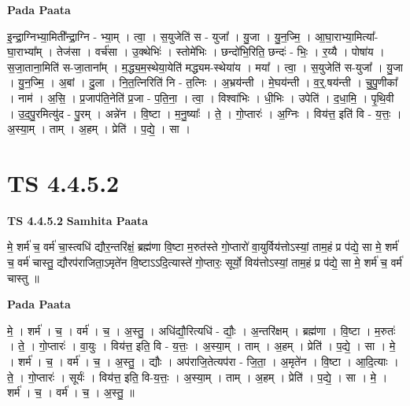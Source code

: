 \documentclass[17pt]{extarticle}
\begin{document}
\textbf{Pada Paata} \newline

इ॒न्द्रा॒ग्निभ्या॒मिती᳚न्द्रा॒ग्नि - भ्या॒म् । त्वा॒ । स॒युजेति॑ स - युजा᳚ । यु॒जा । यु॒न॒ज्मि॒ । आ॒घा॒राभ्या॒मित्या᳚-घा॒राभ्या᳚म् । तेज॑सा । वर्च॑सा । उ॒क्थेभिः॑ । स्तोमे॑भिः । छन्दो॑भि॒रिति॒ छन्दः॑ - भिः॒ । र॒य्यै । पोषा॑य । स॒जा॒ताना॒मिति॑ स-जा॒ताना᳚म् । म॒द्ध्य॒म॒स्थेया॒येति॑ मद्ध्यम-स्थेया॑य । मया᳚ । त्वा॒ । स॒युजेति॑ स-युजा᳚ । यु॒जा । यु॒न॒ज्मि॒ । अ॒बां । दु॒ला । नि॒त॒त्निरिति॑ नि - त॒त्निः । अ॒भ्रय॑न्ती । मे॒घय॑न्ती । व॒र्॒.षय॑न्ती । चु॒पु॒णीका᳚ । नाम॑ । अ॒सि॒ । प्र॒जाप॑ति॒नेति॑ प्र॒जा - प॒ति॒ना॒ । त्वा॒ । विश्वा॑भिः । धी॒भिः । उपेति॑ । द॒धा॒मि॒ । पृ॒थि॒वी । उ॒द॒पु॒रमित्यु॑द - पु॒रम् । अन्ने॑न । वि॒ष्टा । म॒नु॒ष्याः᳚ । ते॒ । गो॒प्तारः॑ । अ॒ग्निः । विय॑त्त॒ इति॑ वि - य॒त्तः॒ । अ॒स्या॒म् । ताम् । अ॒हम् । प्रेति॑ । प॒द्ये॒ । सा ।  \newline




\section*{ TS 4.4.5.2 }

\textbf{TS 4.4.5.2 } \newline
\textbf{Samhita Paata} \newline

मे॒ शर्म॑ च॒ वर्म॑ चा॒स्त्वधि॑ द्यौर॒न्तरि॑क्षं॒ ब्रह्म॑णा वि॒ष्टा म॒रुत॑स्ते गो॒प्तारो॑ वा॒युर्विय॑त्तोऽस्यां॒ ताम॒हं प्र प॑द्ये॒ सा मे॒ शर्म॑ च॒ वर्म॑ चास्तु॒ द्यौरप॑राजिता॒ऽमृते॑न वि॒ष्टाऽऽदि॒त्यास्ते॑ गो॒प्तारः॒ सूर्यो॒ विय॑त्तोऽस्यां॒ ताम॒हं प्र प॑द्ये॒ सा मे॒ शर्म॑ च॒ वर्म॑ चास्तु ॥ \newline

\textbf{Pada Paata} \newline

मे॒ । शर्म॑ । च॒ । वर्म॑ । च॒ । अ॒स्तु॒ । अधि॑द्यौ॒रित्यधि॑ - द्यौः॒ । अ॒न्तरि॑क्षम् । ब्रह्म॑णा । वि॒ष्टा । म॒रुतः॑ । ते॒ । गो॒प्तारः॑ । वा॒युः । विय॑त्त॒ इति॒ वि - य॒त्तः॒ । अ॒स्या॒म् । ताम् । अ॒हम् । प्रेति॑ । प॒द्ये॒ । सा । मे॒ । शर्म॑ । च॒ । वर्म॑ । च॒ । अ॒स्तु॒ । द्यौः । अप॑राजि॒तेत्यप॑रा - जि॒ता॒ । अ॒मृते॑न । वि॒ष्टा । आ॒दि॒त्याः । ते॒ । गो॒प्तारः॑ । सूर्यः॑ । विय॑त्त॒ इति॒ वि-य॒त्तः॒ । अ॒स्या॒म् । ताम् । अ॒हम् । प्रेति॑ । प॒द्ये॒ । सा । मे॒ । शर्म॑ । च॒ । वर्म॑ । च॒ । अ॒स्तु॒ ॥  \newline
\end{document}
